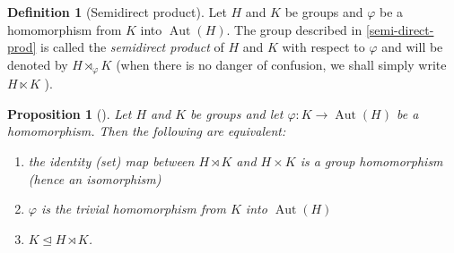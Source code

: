\documentclass[reqno]{amsart}
\newtheorem{proposition}[theorem]{Proposition}
\theoremstyle{definition}
\newtheorem{definition}[theorem]{Definition}
\theoremstyle{remark}
\DeclareMathOperator{\Aut}{Aut}
\begin{document}
\begin{definition}[Semidirect product]
    Let $H$ and $K$ be groups and $\varphi $ be a homomorphism from $K$ into
    $\Aut(H)$. The group described in \ref{semi-direct-prod} is called
    the \textit{semidirect product} of $H$ and $K$ with respect to
    $\varphi $ and will be denoted by $H \rtimes_\varphi  K$ (when there
    is no danger of confusion, we shall simply write $H \ltimes K$ ).
\end{definition}


\begin{proposition}[]
    Let $H$ and $K$ be groups and let $\varphi  \colon K \to \Aut(H)$ be
    a homomorphism. Then the following are equivalent:
    \begin{enumerate}
        \item the identity (set) map between 
            $H \rtimes K$ and $H \times K$ is a group homomorphism (hence an
            isomorphism)
        \item $\varphi $ is the trivial homomorphism from $K$ into $\Aut(H)$ 
        \item $K \trianglelefteq H \rtimes K$.
    \end{enumerate}
\end{proposition}
    
\end{document}
